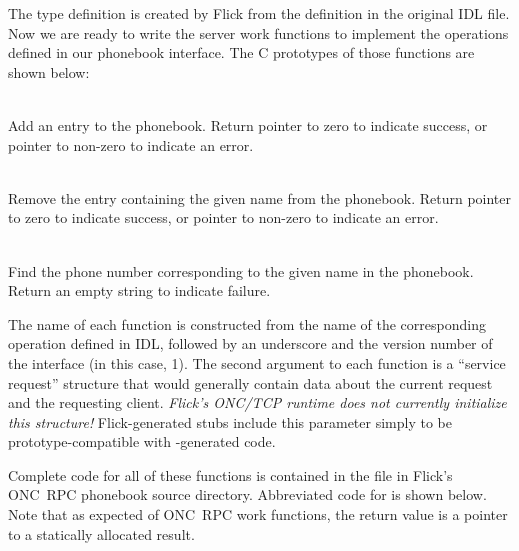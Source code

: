 The  type definition is created by Flick from the 
definition in the original IDL file.  Now we are ready to write the server work
functions to implement the operations defined in our phonebook interface.  The
C prototypes of those functions are shown below:

\begin{list}{}{}
  \item{}\\
  Add an entry to the phonebook.  Return pointer to zero to indicate success,
  or pointer to non-zero to indicate an error.

  \item{}\\
  Remove the entry containing the given name from the phonebook.  Return
  pointer to zero to indicate success, or pointer to non-zero to indicate an
  error.

  \item{}\\
  Find the phone number corresponding to the given name in the phonebook.
  Return an empty string to indicate failure.
\end{list}

The name of each function is constructed from the name of the corresponding
operation defined in IDL, followed by an underscore and the version number of
the interface (in this case, 1).  The second argument to each function is a
``service request'' structure that would generally contain data about the
current request and the requesting client.  \emph{Flick's ONC/TCP runtime does
not currently initialize this structure!}  Flick-generated stubs include this
parameter simply to be prototype-compatible with -generated
code.

Complete code for all of these functions is contained in the
 file in Flick's ONC~RPC phonebook source
directory.  Abbreviated code for  is shown below.  Note that
as expected of ONC~RPC work functions, the return value is a pointer to a
statically allocated result.

